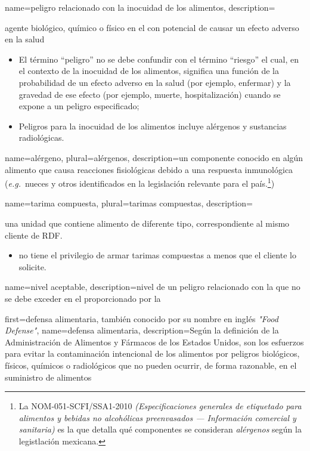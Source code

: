 {
    name={peligro relacionado con la inocuidad de los alimentos},
    description={%
    agente biológico, químico o físico en el  con potencial de causar un efecto adverso en la salud
        \begin{itemize}
            \item[Nota 1] El término “peligro” no se debe confundir con el término “riesgo” el cual, en el contexto de la inocuidad de los alimentos, significa una función de la probabilidad de un efecto adverso en la salud (por ejemplo, enfermar) y la gravedad de ese efecto (por ejemplo, muerte, hospitalización) cuando se expone a un peligro especificado;
            \item[Nota 2] Peligros para la inocuidad de los alimentos incluye alérgenos y sustancias radiológicas.
        \end{itemize}
    }%
}

{
    name={alérgeno},
    plural={alérgenos},
    description={un componente conocido en algún alimento que causa reacciones fisiológicas debido a una respuesta inmunológica (\textit{e.g.}\ nueces y otros identificados en la legislación relevante para el país.\footnote{La NOM-051-SCFI/SSA1-2010 \textit{(Especificaciones generales de etiquetado para alimentos y bebidas no alcohólicas preenvasados --- Información comercial y sanitaria)} es la que detalla qué componentes se consideran \emph{alérgenos} según la legistlación mexicana.})}
}

{
    name={tarima compuesta},
    plural={tarimas compuestas},
    description={%
    una unidad que contiene alimento de diferente tipo, correspondiente al mismo cliente de RDF.
    \begin{itemize}
        \item[Nota:]  no tiene el privilegio de armar tarimas compuestas a menos que el cliente lo solicite.
    \end{itemize}}
}

{
    name={nivel aceptable},
    description={nivel de un peligro relacionado con la  que no se debe exceder en el  proporcionado por la }
}

{
    first={defensa alimentaria, también conocido por su nombre en inglés \textit{"Food Defense"}},
    name={defensa alimentaria},
    description={Según la definición de la Administración de Alimentos y Fármacos de los Estados Unidos, son los esfuerzos para evitar la contaminación intencional de los alimentos por peligros biológicos, físicos, químicos o radiológicos que no pueden ocurrir, de forma razonable, en el suministro de alimentos}
}

